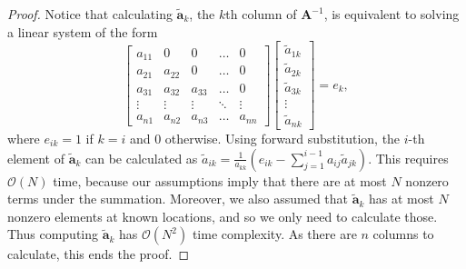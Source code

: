 \documentclass[12pt,letterpaper]{article}
\theoremstyle{propstyle}
\theoremstyle{propstyle}
\theoremstyle{propstyle}
\theoremstyle{propstyle}
\theoremstyle{propstyle}
\newcommand{\ba}{\mathbf{a}}
\newcommand{\bA}{\mathbf{A}}
\begin{document}
\begin{proof}
    Notice that calculating $\tilde{\ba}_k$, the $k$th column of $\bA^{-1}$, is equivalent to solving a linear system of the form
    \begin{equation}
        \left[\begin{array}{ccccc}
            a_{11} & 0 & 0 & \dots & 0 \\
            a_{21} & a_{22} & 0 & \dots & 0 \\
            a_{31} & a_{32} & a_{33} & \dots & 0 \\
            \vdots & \vdots & \vdots & \ddots & \vdots \\
            a_{n1} & a_{n2} & a_{n3} & \dots & a_{nn}
        \end{array}\right]
        \left[\begin{array}{c} \tilde{a}_{1k} \\ \tilde{a}_{2k} \\ \tilde{a}_{3k} \\ \vdots \\ \tilde{a}_{nk} \end{array}\right]
        =
        e_k,
    \end{equation}
    where $e_{ik} = 1$ if $k=i$ and 0 otherwise. Using forward substitution, the $i$-th element of $\tilde{\ba}_k$ can be calculated as $\tilde{a}_{ik} = \frac{1}{a_{kk}}\left(e_{ik} - \sum_{j=1}^{i-1}a_{ij}\tilde{a}_{jk}\right)$. This requires $\mathcal{O}(N)$ time, because our assumptions imply that there are at most $N$ nonzero terms under the summation. Moreover, we also assumed that $\tilde{\ba}_k$ has at most $N$ nonzero elements at known locations, and so we only need to calculate those. Thus computing $\tilde{\ba}_k$ has $\mathcal{O}(N^2)$ time complexity. As there are $n$ columns to calculate, this ends the proof.
\end{proof}


\end{document}
